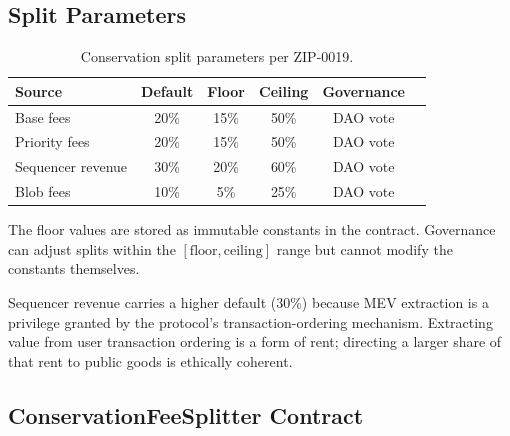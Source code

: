 \documentclass[11pt,letterpaper]{article}
\begin{document}
\subsection{Split Parameters}

\begin{table}[t]
\centering
\begin{tabular}{lccccc}
\toprule
\textbf{Source} & \textbf{Default} & \textbf{Floor} & \textbf{Ceiling} & \textbf{Governance} \\
\midrule
Base fees & 20\% & 15\% & 50\% & DAO vote \\
Priority fees & 20\% & 15\% & 50\% & DAO vote \\
Sequencer revenue & 30\% & 20\% & 60\% & DAO vote \\
Blob fees & 10\% & 5\% & 25\% & DAO vote \\
\bottomrule
\end{tabular}
\caption{Conservation split parameters per ZIP-0019.}
\label{tab:splits}
\end{table}

The floor values are stored as immutable constants in the contract. Governance can adjust splits within the $[\text{floor}, \text{ceiling}]$ range but cannot modify the constants themselves.

Sequencer revenue carries a higher default (30\%) because MEV extraction is a privilege granted by the protocol's transaction-ordering mechanism. Extracting value from user transaction ordering is a form of rent; directing a larger share of that rent to public goods is ethically coherent.

\subsection{ConservationFeeSplitter Contract}
\label{sec:contract}
\end{document}
